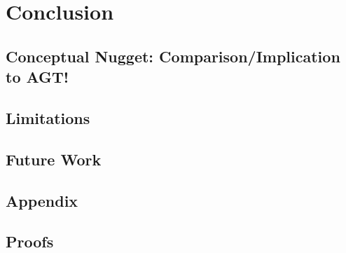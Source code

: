 \chapter{Conclusion}
\label{ch:conclusion}


\section{Conceptual Nugget: Comparison/Implication to AGT!}

\section{Limitations}
\label{sec:limitations}


\section{Future Work}
\label{sec:future-work}


\begin{appendices}
\chapter{Appendix}

\section{Proofs}
\label{sec:proofs}


\end{appendices}

\begin{comment}
\chapter{UNSORTED}

\section{NPC formula}
\label{sec:npc-formula}

\end{comment}